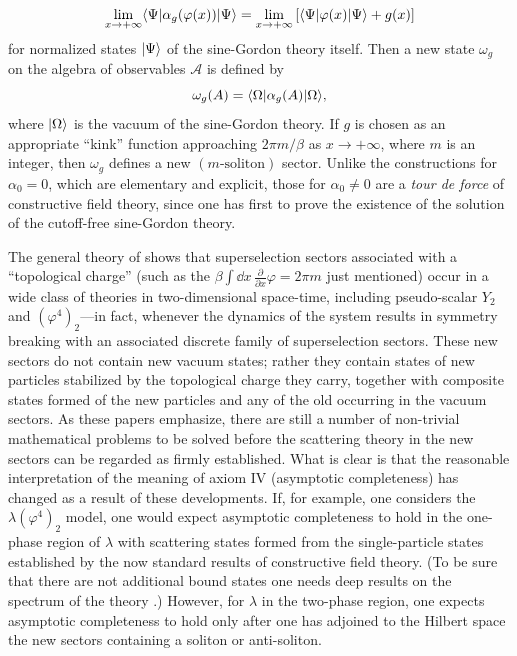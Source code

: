 \begin{equation*}
  \lim_{x\to+\infty}
  \langle \Psi\vert \alpha_g(\varphi(x))\vert \Psi\rangle
  =\lim_{x\to+\infty}
  \left[\langle \Psi\vert \varphi(x)\vert \Psi\rangle+g(x)\right]
\end{equation*}
for normalized states $\lvert \Psi\rangle$ of the sine-Gordon theory itself.  Then a
new state $\omega_g$ on the algebra of observables $\mathcal A$ is defined by
\begin{equation*}
  \omega_g(A)=\langle \Omega\vert \alpha_g(A)\vert \Omega\rangle,
\end{equation*}
where $\lvert \Omega\rangle$ is the vacuum of the sine-Gordon theory.  If $g$ is
chosen as an appropriate ``kink'' function approaching $2\pi m/\beta$ as
$x\to+\infty$, where $m$ is an integer, then $\omega_g$ defines a new
$(m\text{-soliton})$ sector.  Unlike the constructions for $\alpha_0=0$,
which are elementary and explicit, those for $\alpha_0\ne0$ are a \emph{tour
de force} of constructive field theory, since one has first to prove the
existence of the solution of the cutoff-free sine-Gordon theory.

The general theory of \cite{pct-app-78,pct-app-79,pct-app-80,pct-app-81} shows that superselection sectors associated
with a ``topological charge'' (such as the
$\beta\int\dd x\,\frac{\partial}{\partial x}\varphi=2\pi m$ just mentioned)
occur in a wide class of theories in two-dimensional space-time, including
pseudo-scalar $Y_2$ and $(\varphi^4)_2$---in fact, whenever the dynamics of
the system results in symmetry breaking with an associated discrete family of
superselection sectors.  These new sectors do not contain new vacuum states;
rather they contain states of new particles stabilized by the topological
charge they carry, together with composite states formed of the new particles
and any of the old occurring in the vacuum sectors.  As these papers
emphasize, there are still
a number of non-trivial mathematical problems to be solved before the
scattering theory in the new sectors can be regarded as firmly established.
What is clear is that the reasonable interpretation of the meaning of axiom
IV (asymptotic completeness) has changed as a result of these developments.
If, for example, one considers the $\lambda(\varphi^4)_2$ model, one would
expect asymptotic completeness to hold in the one-phase region of $\lambda$
with scattering states formed from the single-particle states established by
the now standard results of constructive field theory.  (To be sure that
there are not additional bound states one needs deep results on the spectrum
of the theory \cite{pct-app-83,pct-app-84,pct-app-85}.)  However, for $\lambda$ in the two-phase region, one
expects asymptotic completeness to hold only after one has adjoined to the
Hilbert space the new sectors containing a soliton or anti-soliton.

